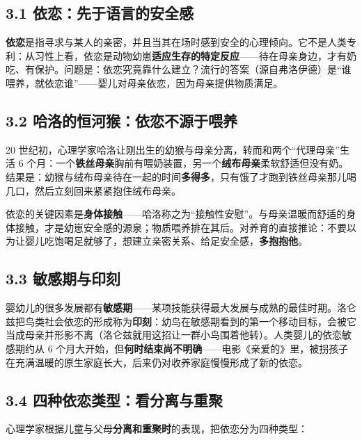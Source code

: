 \documentclass[UTF8,a4paper,11pt]{ctexart}
\begin{document}
\subsection*{3.1 依恋：先于语言的安全感}

\textbf{依恋}是指寻求与某人的亲密，并且当其在场时感到安全的心理倾向。它不是人类专利：从习性上看，依恋是动物幼崽\textbf{适应生存的特定反应}——待在母亲身边，才有奶吃、有保护。问题是：依恋究竟靠什么建立？流行的答案（源自弗洛伊德）是“谁喂养，就依恋谁”——婴儿对母亲依恋，因为母亲提供物质满足。

\subsection*{3.2 哈洛的恒河猴：依恋不源于喂养}

20 世纪初，心理学家哈洛让刚出生的幼猴与母亲分离，转而和两个“代理母亲”生活 6 个月：一个\textbf{铁丝母亲}胸前有喂奶装置，另一个\textbf{绒布母亲}柔软舒适但没有奶。结果是：幼猴与绒布母亲待在一起的时间\textbf{多得多}，只有饿了才跑到铁丝母亲那儿喝几口，然后立刻回来紧紧抱住绒布母亲。

\begin{keyconcept}[接触性安慰]
依恋的关键因素是\textbf{身体接触}——哈洛称之为“接触性安慰”。与母亲温暖而舒适的身体接触，才是幼崽安全感的源泉；物质喂养排在其后。对养育的直接推论：不要以为让婴儿吃饱喝足就够了，想建立亲密关系、给足安全感，\textbf{多抱抱他}。
\end{keyconcept}

\subsection*{3.3 敏感期与印刻}

婴幼儿的很多发展都有\textbf{敏感期}——某项技能获得最大发展与成熟的最佳时期。洛仑兹把鸟类社会依恋的形成称为\textbf{印刻}：幼鸟在敏感期看到的第一个移动目标，会被它当成母亲并形影不离（洛仑兹就用这招让一群小鸟围着他转）。人类婴儿的依恋敏感期约从 6 个月大开始，但\textbf{何时结束尚不明确}——电影《亲爱的》里，被拐孩子在充满温暖的原生家庭长大，后来仍对收养家庭慢慢形成了新的依恋。

\subsection*{3.4 四种依恋类型：看分离与重聚}

心理学家根据儿童与父母\textbf{分离和重聚时}的表现，把依恋分为四种类型：
\end{document}
